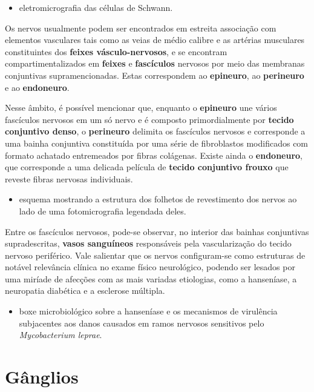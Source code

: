 \documentclass[
]{book}
\providecommand{\tightlist}{%
  \setlength{\itemsep}{0pt}\setlength{\parskip}{0pt}}
\theoremstyle{definition}
\theoremstyle{definition}
\theoremstyle{definition}
\theoremstyle{definition}
\theoremstyle{remark}
\begin{document}
\begin{itemize}
\tightlist
\item
  eletromicrografia das células de Schwann.
\end{itemize}

Os nervos usualmente podem ser encontrados em estreita associação com elementos vasculares tais como as veias de médio calibre e as artérias musculares constituintes dos \textbf{feixes vásculo-nervosos}, e se encontram compartimentalizados em \textbf{feixes} e \textbf{fascículos} nervosos por meio das membranas conjuntivas supramencionadas. Estas correspondem ao \textbf{epineuro}, ao \textbf{perineuro} e ao \textbf{endoneuro}.

Nesse âmbito, é possível mencionar que, enquanto o \textbf{epineuro} une vários fascículos nervosos em um só nervo e é composto primordialmente por \textbf{tecido conjuntivo denso}, o \textbf{perineuro} delimita os fascículos nervosos e corresponde a uma bainha conjuntiva constituída por uma série de fibroblastos modificados com formato achatado entremeados por fibras colágenas. Existe ainda o \textbf{endoneuro}, que corresponde a uma delicada película de \textbf{tecido conjuntivo frouxo} que reveste fibras nervosas individuais.

\begin{itemize}
\tightlist
\item
  esquema mostrando a estrutura dos folhetos de revestimento dos nervos ao lado de uma fotomicrografia legendada deles.
\end{itemize}

Entre os fascículos nervosos, pode-se observar, no interior das bainhas conjuntivas supradescritas, \textbf{vasos sanguíneos} responsáveis pela vascularização do tecido nervoso periférico. Vale salientar que os nervos configuram-se como estruturas de notável relevância clínica no exame físico neurológico, podendo ser lesados por uma miríade de afecções com as mais variadas etiologias, como a hanseníase, a neuropatia diabética e a esclerose múltipla.

\begin{itemize}
\tightlist
\item
  boxe microbiológico sobre a hanseníase e os mecanismos de virulência subjacentes aos danos causados em ramos nervosos sensitivos pelo \emph{Mycobacterium leprae}.
\end{itemize}

\hypertarget{guxe2nglios}{%
\chapter{Gânglios}\label{guxe2nglios}}
\end{document}
